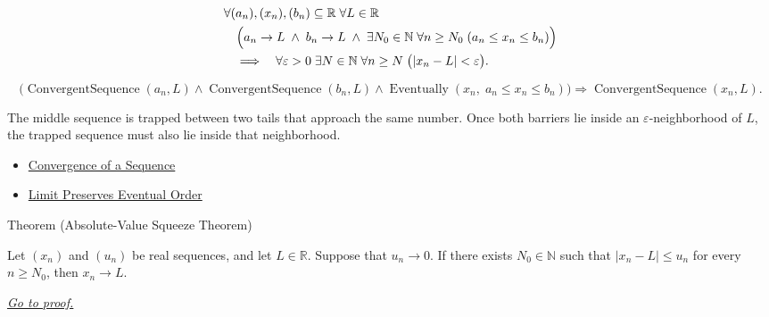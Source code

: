 \begin{remark*}
\[
\begin{aligned}
&\forall (a_n),(x_n),(b_n)\subseteq\mathbb{R}\;\forall L\in\mathbb{R}\\
&\quad\Bigl(
  a_n\to L
  \;\land\;
  b_n\to L
  \;\land\;
  \exists N_0\in\mathbb{N}\;\forall n\ge N_0\;(a_n\le x_n\le b_n)
\Bigr)\\
&\quad\Longrightarrow\quad
\forall \varepsilon>0\;\exists N\in\mathbb{N}\;\forall n\ge N\;
\bigl(|x_n-L|<\varepsilon\bigr).
\end{aligned}
\]
\end{remark*}

\begin{remark*}
\[
\bigl(
\operatorname{ConvergentSequence}(a_n,L)
\land
\operatorname{ConvergentSequence}(b_n,L)
\land
\operatorname{Eventually}(x_n,\;a_n\le x_n\le b_n)
\bigr)
\Longrightarrow
\operatorname{ConvergentSequence}(x_n,L).
\]
\end{remark*}

\begin{remark*}[Interpretation]
The middle sequence is trapped between two tails that approach the same
number. Once both barriers lie inside an $\varepsilon$-neighborhood of $L$,
the trapped sequence must also lie inside that neighborhood.
\end{remark*}

\begin{remark*}[Dependencies]
\begin{itemize}
  \item \hyperref[def:convergent-sequence]{Convergence of a Sequence}
  \item \hyperref[thm:limit-preserves-eventual-order]{Limit Preserves Eventual Order}
\end{itemize}
\end{remark*}


\begin{theorembox}{Theorem (Absolute-Value Squeeze Theorem)}
\begin{theorem}
\label{thm:absolute-value-squeeze-theorem}

Let $(x_n)$ and $(u_n)$ be real sequences, and let $L\in\mathbb{R}$.
Suppose that $u_n\to 0$. If there exists $N_0\in\mathbb{N}$ such that
$|x_n-L|\le u_n$ for every $n\ge N_0$, then $x_n\to L$.

\smallskip
\noindent
\hyperref[prf:absolute-value-squeeze-theorem]{\textit{Go to proof.}}
\end{theorem}
\end{theorembox}

